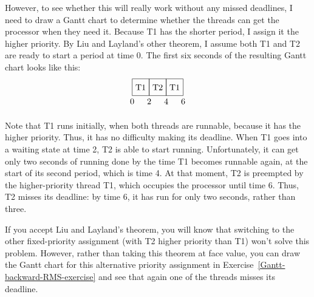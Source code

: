However, to see whether this will really work without any missed
deadlines, I need to draw a Gantt chart to determine whether the threads can get the processor when
they need it.  Because T1 has the shorter
period, I assign it the higher priority.  By Liu and Layland's other
theorem, I assume both T1 and T2 are ready to start a period at time
0.  The first six seconds of the resulting Gantt chart looks like this:
\[\begin{tikzpicture}[scale=.035]
\draw (0,0) rectangle (20,20);
\draw (20,0) rectangle (40,20);
\draw (40,0) rectangle (60,20);
\draw (10,10) node{T1};
\draw (30,10) node{T2};
\draw (50,10) node{T1};
\draw (0,-7) node{0};
\draw (20,-7) node{2};
\draw (40,-7) node{4};
\draw (60,-7) node{6};
\end{tikzpicture}\]

Note that T1 runs initially, when both threads are runnable, because
it has the higher priority.  Thus, it has no difficulty making its
deadline.  When T1 goes into a waiting state at time 2, T2 is able to
start running.  Unfortunately, it can get only two seconds of running
done by the time T1 becomes runnable again, at the start of its second
period, which is time 4.  At that moment, T2 is preempted by the
higher-priority thread T1, which occupies the processor until time 6.
Thus, T2 misses its deadline: by time 6, it has run for only two
seconds, rather than three.

If you accept Liu and Layland's theorem, you will know that switching
to the other fixed-priority assignment (with T2 higher priority than
T1) won't solve this problem.  However, rather than taking this
theorem at face value, you can draw the Gantt chart for
this alternative priority assignment in Exercise~\ref{Gantt-backward-RMS-exercise} and see that again one of the
threads misses its deadline.

